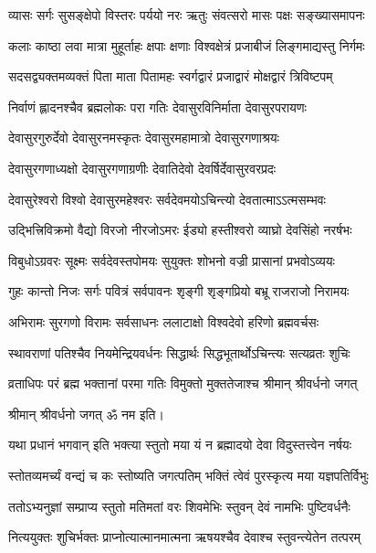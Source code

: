 \twolineshloka
{व्यासः सर्गः सुसङ्क्षेपो विस्तरः पर्ययो नरः}%
{ऋतुः संवत्सरो मासः पक्षः सङ्ख्यासमापनः}%

\twolineshloka
{कलाः काष्ठा लवा मात्रा मुहूर्ताहः क्षपाः क्षणाः}%
{विश्वक्षेत्रं प्रजाबीजं लिङ्गमाद्यस्तु निर्गमः}%

\twolineshloka
{सदसद्व्यक्तमव्यक्तं पिता माता पितामहः}%
{स्वर्गद्वारं प्रजाद्वारं मोक्षद्वारं त्रिविष्टपम्}%

\twolineshloka
{निर्वाणं ह्लादनश्चैव ब्रह्मलोकः परा गतिः}%
{देवासुरविनिर्माता देवासुरपरायणः}%

\twolineshloka
{देवासुरगुरुर्देवो देवासुरनमस्कृतः}%
{देवासुरमहामात्रो देवासुरगणाश्रयः}%

\twolineshloka
{देवासुरगणाध्यक्षो देवासुरगणाग्रणीः}%
{देवातिदेवो देवर्षिर्देवासुरवरप्रदः}%

\twolineshloka
{देवासुरेश्वरो विश्वो देवासुरमहेश्वरः}%
{सर्वदेवमयोऽचिन्त्यो देवतात्माऽऽत्मसम्भवः}%

\twolineshloka
{उद्भित्त्रिविक्रमो वैद्यो विरजो नीरजोऽमरः}%
{ईड्यो हस्तीश्वरो व्याघ्रो देवसिंहो नरर्षभः}%

\twolineshloka
{विबुधोऽग्रवरः सूक्ष्मः सर्वदेवस्तपोमयः}%
{सुयुक्तः शोभनो वज्री प्रासानां प्रभवोऽव्ययः}%

\twolineshloka
{गुहः कान्तो निजः सर्गः पवित्रं सर्वपावनः}%
{शृङ्गी शृङ्गप्रियो बभ्रू राजराजो निरामयः}%

\twolineshloka
{अभिरामः सुरगणो विरामः सर्वसाधनः}%
{ललाटाक्षो विश्वदेवो हरिणो ब्रह्मवर्चसः}%

\twolineshloka
{स्थावराणां पतिश्चैव नियमेन्द्रियवर्धनः}%
{सिद्धार्थः सिद्धभूतार्थोऽचिन्त्यः सत्यव्रतः शुचिः}%

\twolineshloka
{व्रताधिपः परं ब्रह्म भक्तानां परमा गतिः}%
{विमुक्तो मुक्ततेजाश्च श्रीमान् श्रीवर्धनो जगत्}%

श्रीमान् श्रीवर्धनो जगत् ॐ नम इति।

\resetShloka
{}

\twolineshloka
{यथा प्रधानं भगवान् इति भक्त्या स्तुतो मया}
{यं न ब्रह्मादयो देवा विदुस्तत्त्वेन नर्षयः}%

\twolineshloka
{स्तोतव्यमर्च्यं वन्द्यं च कः स्तोष्यति जगत्पतिम्}%
{भक्तिं त्वेवं पुरस्कृत्य मया यज्ञपतिर्विभुः}%


\twolineshloka
{ततोऽभ्यनुज्ञां सम्प्राप्य स्तुतो मतिमतां वरः}%
{शिवमेभिः स्तुवन् देवं नामभिः पुष्टिवर्धनैः}%


\twolineshloka
{नित्ययुक्तः शुचिर्भक्तः प्राप्नोत्यात्मानमात्मना}%
{ऋषयश्चैव देवाश्च स्तुवन्त्येतेन तत्परम्}%


